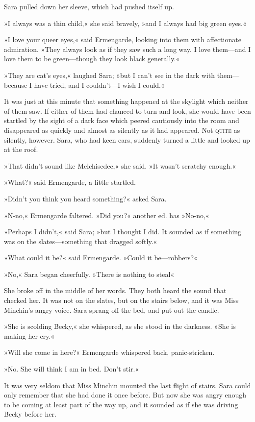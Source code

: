 Sara pulled down her sleeve, which had pushed itself up.

»I always was a thin child,« she said bravely, »and I always had big green eyes.«

»I love your queer eyes,« said Ermengarde, looking into them with affectionate admiration. »They always look as if they saw such a long way. I love them—and I love them to be green—though they look black generally.«

»They are cat's eyes,« laughed Sara; »but I can't see in the dark with them—because I have tried, and I couldn't—I wish I could.«

It was just at this minute that something happened at the skylight which neither of them saw. If either of them had chanced to turn and look, she would have been startled by the sight of a dark face which peered cautiously into the room and disappeared as quickly and almost as silently as it had appeared. Not \textsc{quite} as silently, however. Sara, who had keen ears, suddenly turned a little and looked up at the roof.

»That didn't sound like Melchisedec,« she said. »It wasn't scratchy enough.«

»What?« said Ermengarde, a little startled.

»Didn't you think you heard something?« asked Sara.

»N-no,« Ermengarde faltered. »Did you?« {another ed. has »No-no,«}

»Perhaps I didn't,« said Sara; »but I thought I did. It sounded as if something was on the slates—something that dragged softly.«

»What could it be?« said Ermengarde. »Could it be—robbers?«

»No,« Sara began cheerfully. »There is nothing to steal\longdash«

She broke off in the middle of her words. They both heard the sound that checked her. It was not on the slates, but on the stairs below, and it was Miss Minchin's angry voice. Sara sprang off the bed, and put out the candle.

»She is scolding Becky,« she whispered, as she stood in the darkness. »She is making her cry.«

»Will she come in here?« Ermengarde whispered back, panic-stricken.

»No. She will think I am in bed. Don't stir.«

It was very seldom that Miss Minchin mounted the last flight of stairs. Sara could only remember that she had done it once before. But now she was angry enough to be coming at least part of the way up, and it sounded as if she was driving Becky before her.

